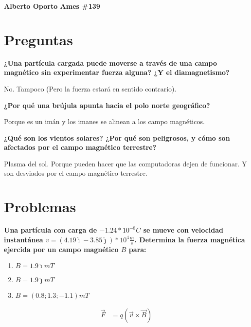 \documentclass[10pt, twoside]{article}
\begin{document}
\thispagestyle{fancy}

\textbf{Alberto Oporto Ames \#139}

\section*{Preguntas}%

\textbf{¿Una partícula cargada puede moverse a través de una campo magnético
sin experimentar fuerza alguna?
¿Y el diamagnetismo?}

No. Tampoco (Pero la fuerza estará en sentido contrario).

\textbf{¿Por qué una brújula apunta hacia el polo norte geográfico?}

Porque es un imán y los imanes se alinean a los campo magnéticos.

\textbf{¿Qué son los vientos solares?
¿Por qué son peligrosos, y cómo son afectados por el campo magnético
terrestre?}

Plasma del sol.
Porque pueden hacer que las computadoras dejen de funcionar.
Y son desviados por el campo magnético terrestre.

\section*{Problemas}%
\textbf{
	\boldmath
	Una partícula con carga de $-1.24*10^{-8}C$ se mueve con velocidad instantánea
	$\allowbreak v=(4.19\hat{\imath}-3.85\hat{\jmath})*10^4 \frac{m}{s}$.
	Determina la fuerza magnética ejercida por un campo magnético $B$ para:
}
\begin{enumerate}[label=\alph*.]
	\item $B=1.9\hat{\imath}mT$
	\item $B=1.9\hat{\jmath}mT$
	\item $B=(0.8;1.3;-1.1)mT$
\end{enumerate}

\begin{align*}
	\vec{F} &= q(\vec{v}\times\vec{B})
\end{align*}
\end{document}
